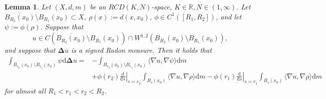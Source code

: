 \documentclass{article}
\newtheorem{lemma}[theorem]{Lemma}
\theoremstyle{remark}
\numberwithin{equation}{section}
\theoremstyle{definition}
\begin{document}
    \begin{lemma}\label{Stokes_2}
    	Let $(X,d,m)$ be an $RCD(K,N)$-space, $K \in \mathbb{R}, N \in (1,\infty)$. Let $\overline{B_{R_{2}}(x_{0})} \setminus B_{R_{1}}(x_{0}) \subset X$, $\rho(x) := d(x,x_{0})$, $\phi \in C^{1}([R_{1},R_{2}])$, and let $\psi := \phi(\rho)$. Suppose that
    	\begin{equation}
    		u \in C(\overline{B_{R_{2}}(x_{0})} \setminus B_{R_{1}}(x_{0})) \cap W^{1,2}(B_{R_{2}}(x_{0}) \setminus B_{R_{1}}(x_{0})),
    	\end{equation}
    	and suppose that $\mathbf{\Delta} u$ is a signed Radon measure. Then it holds that
    	\begin{equation}
    		\begin{split}
    			\int_{B_{r_{2}}(x_{0}) \setminus B_{r_{1}}(x_{0})} \psi \mathrm{d} \mathbf{\Delta} u = & - \int_{B_{r_{2}}(x_{0}) \setminus B_{r_{1}}(x_{0})} \langle \nabla u , \nabla \psi \rangle \mathrm{d}m\\
    			& + \phi(r_{2}) \left. \frac{\mathrm{d}}{\mathrm{d}s} \right|_{s = r_{2}} \int_{B_{s}(x_{0})} \langle \nabla u, \nabla \rho \rangle \mathrm{d}m - \phi(r_{1}) \left. \frac{\mathrm{d}}{\mathrm{d}s} \right|_{s = r_{1}} \int_{B_{s}(x_{0})} \langle \nabla u, \nabla \rho \rangle \mathrm{d}m
    		\end{split}
    	\end{equation}
        for almost all $R_{1} < r_{1} < r_{2} < R_{2}$.
    \end{lemma}
\end{document}
